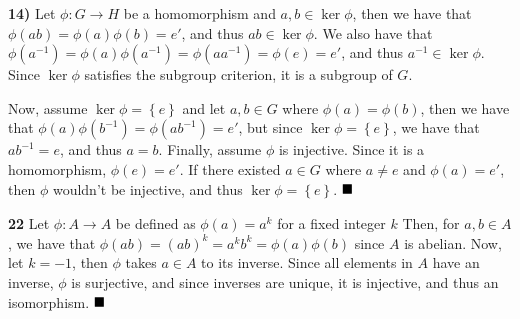 \documentclass[12pt]{article}
\newcommand{\braceb}[1]{\left\{#1\right\}}
\newcommand{\done}{\ensuremath{\strut\hfill\blacksquare}}
\begin{document}
\textbf{14)} Let \( \phi : G \to H \) be a homomorphism and
\( a, b \in \ker\phi \), then we have that
\( \phi(ab) = \phi(a)\phi(b) = e' \), and thus \( ab \in \ker\phi \).
We also have that
\( \phi(a^{-1}) = \phi(a)\phi(a^{-1}) = \phi(aa^{-1}) = \phi(e) = e' \), and
thus \( a^{-1} \in \ker\phi \).
Since \( \ker\phi \) satisfies the subgroup criterion, it is a subgroup of
\( G \).

Now, assume \( \ker\phi = \braceb{e} \) and let \( a, b \in G \) where
\( \phi(a) = \phi(b) \), then we have that
\( \phi(a)\phi(b^{-1}) = \phi(ab^{-1}) = e' \), but since
\( \ker\phi = \braceb{e} \), we have that \( ab^{-1} = e \), and thus
\( a = b \).
Finally, assume \( \phi \) is injective.
Since it is a homomorphism, \( \phi(e) = e' \).
If there existed \( a \in G \) where \( a \ne e \) and \( \phi(a) = e' \), then
\( \phi \) wouldn't be injective, and thus \( \ker\phi = \braceb{e} \).
\done

\textbf{22} Let \( \phi : A \to A \) be defined as \( \phi(a) = a^k \) for
a fixed integer \( k \)
Then, for \( a, b \in A \), we have that
\( \phi(ab) = (ab)^k = a^kb^k = \phi(a)\phi(b) \) since \( A \) is abelian.
Now, let \( k = -1 \), then \( \phi \) takes \( a \in A \) to its inverse.
Since all elements in \( A \) have an inverse, \( \phi \) is surjective, and
since inverses are unique, it is injective, and thus an isomorphism.
\done
\end{document}
